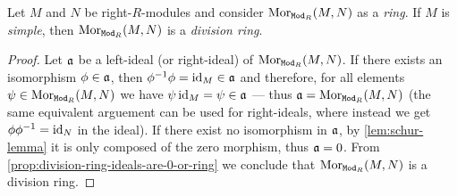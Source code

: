 \begin{corollary}
    \label{cor:M-simple-Mor-division-ring}
    Let \(M\) and \(N\) be right-\(R\)-modules and consider
    \(\operatorname{Mor}_{{\texttt{Mod}_{R}}}(M, N)\) as a \emph{ring}. If \(M\) is \emph{simple}, then
    \(\operatorname{Mor}_{{\texttt{Mod}_{R}}}(M, N)\) is a \emph{division ring}.
\end{corollary}

\begin{proof}
    Let \(\mathfrak{a}\) be a left-ideal (or right-ideal) of \(\operatorname{Mor}_{{\texttt{Mod}_{R}}}(M,
    N)\). If there exists an isomorphism \(\phi \in \mathfrak{a}\), then
    \(\phi^{-1} \phi = \operatorname{id}_M \in \mathfrak{a}\) and therefore, for all elements
    \(\psi \in \operatorname{Mor}_{{\texttt{Mod}_{R}}}(M, N)\) we have \(\psi \operatorname{id}_M = \psi \in \mathfrak{a}\)
    --- thus \(\mathfrak{a} = \operatorname{Mor}_{{\texttt{Mod}_{R}}}(M, N)\) (the same equivalent arguement can
    be used for right-ideals, where instead we get \(\phi \phi^{-1} = \operatorname{id}_N\) in the
    ideal). If there exist no isomorphism in \(\mathfrak{a}\), by
    \cref{lem:schur-lemma} it is only composed of the zero morphism, thus
    \(\mathfrak{a} = 0\). From \cref{prop:division-ring-ideals-are-0-or-ring} we
    conclude that \(\operatorname{Mor}_{{\texttt{Mod}_{R}}}(M, N)\) is a division ring.
\end{proof}

